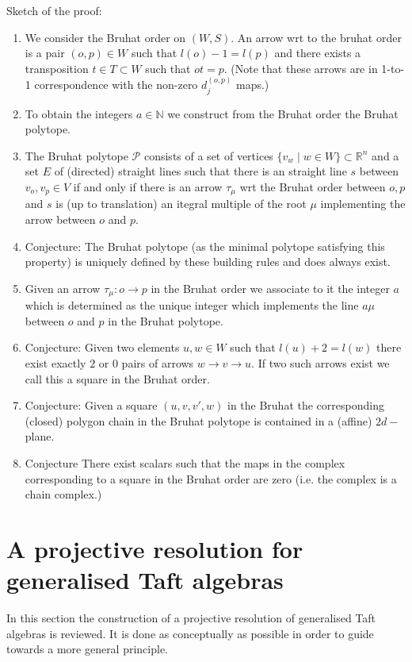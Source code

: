 \documentclass{amsart}
\theoremstyle{definition}
\begin{document}
	Sketch of the proof:
	\begin{enumerate}
		\item We consider the Bruhat order on $(W,S)$.
			An arrow wrt to the bruhat order is a  pair $(o,p)\in W$ such that 
			$l(o)-1 = l(p)$ and there exists a transposition $t\in T\subset W$ such that $ot=p$.
			(Note that these arrows are in 1-to-1 correspondence with the non-zero $d^{(o,p)}_j$ maps.) 
		\item To obtain the integers $a \in \mathbb N$ we construct from the Bruhat order the Bruhat polytope.
		\item The Bruhat polytope $\mathcal P$ consists of a set of vertices $\{v_w \mid w \in W\}\subset \mathbb R^n$ and a set $E$ of (directed) straight lines such that there is an straight line $s$ between $v_o,v_p \in V$ if and only if there is an arrow $\tau_\mu$ wrt the Bruhat order between $o,p$ and
		$s$ is (up to translation) an itegral multiple of the root $\mu$ implementing the arrow between $o$ and $p$.
		\item Conjecture: The Bruhat polytope (as the minimal polytope satisfying this property) is uniquely defined by these building rules and does always exist.
		\item Given an arrow $\tau_\mu: o \rightarrow p$ in the Bruhat order we associate to it the integer $a$ which is determined as the unique integer which implements the line $a\mu$ between $o$ and $p$ in the Bruhat polytope.		
		\item Conjecture: Given two elements $u,w\in W$ such that $l(u)+2= l(w)$ there exist exactly $2$ or $0$ pairs of arrows	$w \rightarrow v \rightarrow u$. If two such arrows exist we call this a square in the Bruhat order.
		\item Conjecture: Given a square $(u,v,v',w)$ in the Bruhat the corresponding (closed) polygon chain in the Bruhat polytope is contained in a (affine) $2d-$ plane.
		\item Conjecture There exist scalars such that the maps in the complex corresponding to a square in the Bruhat order are zero (i.e. the complex is a chain complex.)
	\end{enumerate}


	
	
	\section{A projective resolution for generalised Taft algebras}
	
	In this section the construction of a projective resolution of generalised Taft algebras is reviewed.
	It is done as conceptually as possible in order to guide towards a more general principle.
	
\end{document}
